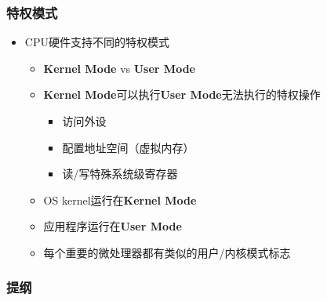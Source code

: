 \begin{frame}
	\frametitle{特权模式}
	\begin{itemize}
		\item CPU硬件支持不同的特权模式
		\begin{itemize}
			\item \textbf{Kernel Mode} vs \textbf{User Mode}
			\item \textbf{Kernel Mode}可以执行\textbf{User Mode}无法执行的特权操作
			\begin{itemize}
				\item 访问外设
				\item 配置地址空间（虚拟内存）
				\item 读/写特殊系统级寄存器
			\end{itemize}			
			
			\item OS kernel运行在\textbf{Kernel Mode} 
			\item 应用程序运行在\textbf{User Mode}
			\item 每个重要的微处理器都有类似的用户/内核模式标志
				
		\end{itemize}
	\end{itemize}
\end{frame}

\begin{frame}
    \frametitle{提纲} 
    \tableofcontents 
\end{frame}


